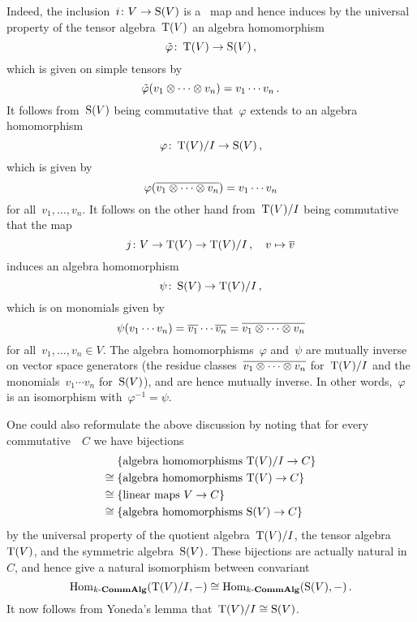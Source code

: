Indeed, the inclusion~$i \colon V \to \operatorname{S}(V)$ is a~{\klin} map and hence induces by the universal property of the tensor algebra~$\operatorname{T}(V)$ an algebra homomorphism
\[
          \tilde{\varphi}
  \colon  \operatorname{T}(V)
  \to     \operatorname{S}(V) \,,
\]
which is given on simple tensors by
\[
    \tilde{\varphi}(v_1 \otimes \dotsb \otimes v_n)
  = v_1 \dotsm v_n \,.
\]
It follows from~$\operatorname{S}(V)$ being commutative that~$\varphi$ extends to an algebra homomorphism
\[
          \varphi
  \colon  \operatorname{T}(V)/I
  \to     \operatorname{S}(V) \,,
\]
which is given by
\[
    \varphi( \overline{v_1 \otimes \dotsb \otimes v_n} )
  = v_1 \dotsm v_n
\]
for all~$v_1, \dotsc, v_n$.
It follows on the other hand from~$\operatorname{T}(V)/I$ being commutative that the {\klin} map
\[
          j
  \colon  V
  \to     \operatorname{T}(V)
  \to     \operatorname{T}(V)/I \,,
  \quad   v
  \mapsto \overline{v}
\]
induces an algebra homomorphism
\[
          \psi
  \colon  \operatorname{S}(V)
  \to     \operatorname{T}(V)/I \,,
\]
which is on monomials given by
\[
    \psi(v_1 \dotsm v_n)
  = \overline{v_1} \dotsm \overline{v_n}
  = \overline{v_1 \otimes \dotsb \otimes v_n}
\]
for all~$v_1, \dotsc, v_n \in V$.
The algebra homomorphisms~$\varphi$ and~$\psi$ are mutually inverse on vector space generators (the residue classes~$\overline{v_1 \otimes \dotsb \otimes v_n}$ for~$\operatorname{T}(V)/I$ and the monomials~$v_1 \dotsm v_n$ for~$\operatorname{S}(V)$), and are hence mutually inverse.
In other words,~$\varphi$ is an isomorphism with~$\varphi^{-1} = \psi$.


\begin{remark}
  One could also reformulate the above discussion by noting that for every commutative~{\kalg}~$C$ we have bijections
  \begin{align*}
         {}&  \{ \text{algebra homomorphisms~$\operatorname{T}(V)/I \to C$} \} \\
    \cong{}&  \{ \text{algebra homomorphisms~$\operatorname{T}(V) \to C$} \} \\
    \cong{}&  \{ \text{linear maps~$V \to C$} \}  \\
    \cong{}&  \{ \text{algebra homomorphisms~$\operatorname{S}(V) \to C$} \}
  \end{align*}
  by the universal property of the quotient algebra~$\operatorname{T}(V)/I$, the tensor algebra~$\operatorname{T}(V)$, and the symmetric algebra~$\operatorname{S}(V)$.
  These bijections are actually natural in~$C$, and hence give a natural isomorphism between convariant~
  \[
          \operatorname{Hom}_{\text{$k$-$\mathbf{CommAlg}$}}(\operatorname{T}(V)/I, -)
    \cong \operatorname{Hom}_{\text{$k$-$\mathbf{CommAlg}$}}(\operatorname{S}(V), -) \,.
  \]
  It now follows from Yoneda’s lemma that~$\operatorname{T}(V)/I \cong \operatorname{S}(V)$.
\end{remark}

